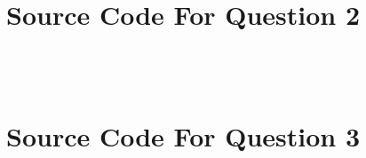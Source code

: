 \documentclass[a4paper,12pt]{article}
\begin{document}
		\newpage
\begin{appendices}
	\section{Source Code For Question 2}
		 \-\\[1cm]

		 \-\\[1cm]
		\newpage
	\section{Source Code For Question 3}
		 \-\\[1cm]
\end{appendices}
				
\end{document}
